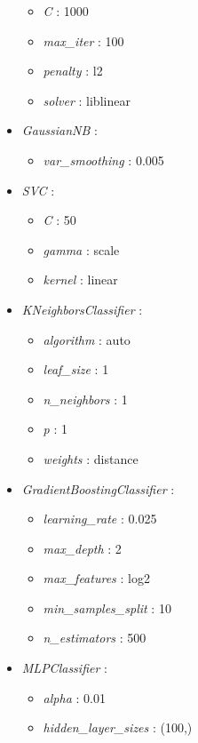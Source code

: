\documentclass{article}
\begin{document}
\begin{small}
\begin{multicols}{2}
\begin{itemize}
    \begin{itemize}
        \item \textit{C} : 1000
        \item \textit{max\_iter} : 100
        \item \textit{penalty} : l2
        \item \textit{solver} : liblinear
    \end{itemize}
    \item \textit{GaussianNB} :
    \begin{itemize}
        \item \textit{var\_smoothing} : 0.005
    \end{itemize}
    \item \textit{SVC} :
    \begin{itemize}
        \item \textit{C} : 50
        \item \textit{gamma} : scale
        \item \textit{kernel} : linear
    \end{itemize}
    \item \textit{KNeighborsClassifier} :
    \begin{itemize}
        \item \textit{algorithm} : auto
        \item \textit{leaf\_size} : 1
        \item \textit{n\_neighbors} : 1
        \item \textit{p} : 1
        \item \textit{weights} : distance
    \end{itemize}
    \item \textit{GradientBoostingClassifier} :
    \begin{itemize}
        \item \textit{learning\_rate} : 0.025
        \item \textit{max\_depth} : 2
        \item \textit{max\_features} : log2
        \item \textit{min\_samples\_split} : 10
        \item \textit{n\_estimators} : 500
    \end{itemize}
    \item \textit{MLPClassifier} :
    \begin{itemize}
        \item \textit{alpha} : 0.01
        \item \textit{hidden\_layer\_sizes} : (100,)

\end{itemize}
\end{itemize}
\end{multicols}
\end{small}
\end{document}
